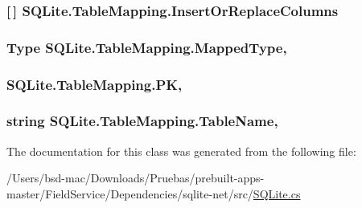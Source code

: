 \hypertarget{class_s_q_lite_1_1_table_mapping_ac88c964d9ed3ad2c6827ccfbe8765187}{
\subsubsection[{Insert\+Or\+Replace\+Columns}]{ \mbox{[}$\,$\mbox{]} S\+Q\+Lite.\+Table\+Mapping.\+Insert\+Or\+Replace\+Columns\hspace{0.3cm}{\ttfamily [get]}}}\label{class_s_q_lite_1_1_table_mapping_ac88c964d9ed3ad2c6827ccfbe8765187}
\hypertarget{class_s_q_lite_1_1_table_mapping_a33ac15671e4d3371a8fa2834d17fb8e8}{
\subsubsection[{Mapped\+Type}]{\setlength{\rightskip}{0pt plus 5cm}Type S\+Q\+Lite.\+Table\+Mapping.\+Mapped\+Type\hspace{0.3cm}{\ttfamily [get]}, {\ttfamily [set]}}}\label{class_s_q_lite_1_1_table_mapping_a33ac15671e4d3371a8fa2834d17fb8e8}
\hypertarget{class_s_q_lite_1_1_table_mapping_a322b91d1a0085e98355a830c970aee05}{
\subsubsection[{P\+K}]{ S\+Q\+Lite.\+Table\+Mapping.\+P\+K\hspace{0.3cm}{\ttfamily [get]}, {\ttfamily [set]}}}\label{class_s_q_lite_1_1_table_mapping_a322b91d1a0085e98355a830c970aee05}
\hypertarget{class_s_q_lite_1_1_table_mapping_aa4f8f4620985ceca6db33ab061649f29}{
\subsubsection[{Table\+Name}]{\setlength{\rightskip}{0pt plus 5cm}string S\+Q\+Lite.\+Table\+Mapping.\+Table\+Name\hspace{0.3cm}{\ttfamily [get]}, {\ttfamily [set]}}}\label{class_s_q_lite_1_1_table_mapping_aa4f8f4620985ceca6db33ab061649f29}


The documentation for this class was generated from the following file\+:\begin{DoxyCompactItemize}
\item 
/\+Users/bsd-\/mac/\+Downloads/\+Pruebas/prebuilt-\/apps-\/master/\+Field\+Service/\+Dependencies/sqlite-\/net/src/\hyperlink{_s_q_lite_8cs}{S\+Q\+Lite.\+cs}\end{DoxyCompactItemize}
